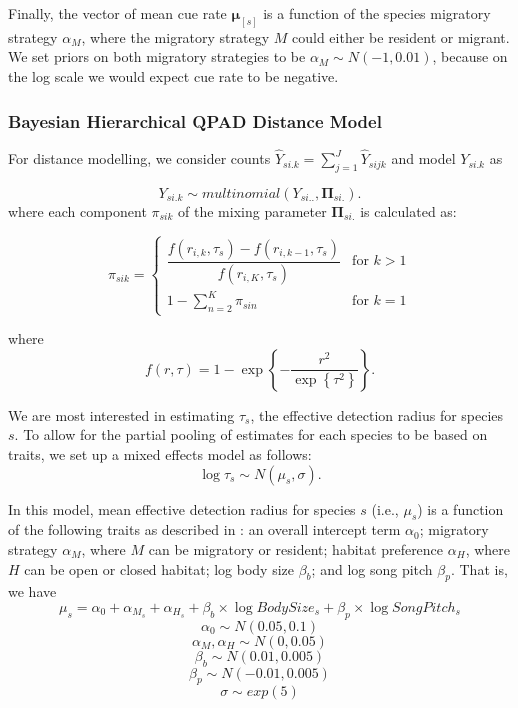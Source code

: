 \par Finally, the vector of mean cue rate $\mathbf{\mu}_{[s]}$ is a function of the species migratory strategy $\alpha_M$, where the migratory strategy $M$ could either be resident or migrant. 
We set priors on both migratory strategies to be $\alpha_M \sim N(-1, 0.01)$, because on the log scale we would expect cue rate to be negative. 

\subsubsection{Bayesian Hierarchical QPAD Distance Model}

\par For distance modelling, we consider counts $\hat{Y}_{si.k} = \sum_{j=1}^{J}\hat{Y}_{sijk}$ and model $Y_{si.k}$ as

$$Y_{si.k} \sim multinomial\left(Y_{si..}, \mathbf{\Pi}_{si.}\right).$$
where each component $\pi_{sik}$ of the mixing parameter $\mathbf{\Pi}_{si.}$ is calculated as:

\begin{equation*}
	\pi_{sik} = 
	\begin{cases}
		\dfrac{f(r_{i,k}, \tau_s) - f(r_{i,k-1}, \tau_s)}{f(r_{i,K}, \tau_s)} & \text{for } k > 1 \\
		1 - \sum_{n = 2}^{K} \pi_{sin} & \text{for } k = 1
	\end{cases}
\end{equation*}

where 
$$f(r,\tau) =  1 - \exp\left\{ -\dfrac{r^2}{\exp\left\{\tau^2\right\}} \right\} .$$

\par We are most interested in estimating $\tau_s$, the effective detection radius for species $s$. 
To allow for the partial pooling of estimates for each species to be based on traits, we set up a mixed effects model as follows:
$$\log \tau_s \sim N(\mu_s, \sigma).$$

\par In this model, mean effective detection radius for species $s$ (i.e., $\mu_s$) is a function of the following traits as described in \cite{solymos_phylogeny_2018}: an overall intercept term $\alpha_0$; migratory strategy $\alpha_M$, where $M$ can be migratory or resident; habitat preference $\alpha_H$, where $H$ can be open or closed habitat; log body size $\beta_b$; and log song pitch $\beta_p$. 
That is, we have
$$ \mu_s = \alpha_0 + \alpha_{M_s} + \alpha_{H_s} + \beta_b \times \log BodySize_s + \beta_p \times \log SongPitch_s$$
$$\alpha_0 \sim N(0.05, 0.1)$$
$$ \alpha_M, \alpha_H \sim N(0, 0.05)$$
$$ \beta_b \sim N(0.01, 0.005)$$
$$ \beta_p \sim N(-0.01, 0.005) $$
$$\sigma \sim exp(5)$$

